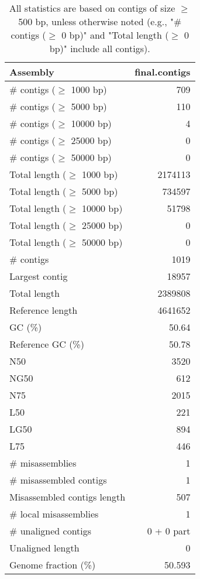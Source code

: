 \documentclass[12pt,a4paper]{article}
\begin{document}
\begin{table}[ht]
\begin{center}
\caption{All statistics are based on contigs of size $\geq$ 500 bp, unless otherwise noted (e.g., "\# contigs ($\geq$ 0 bp)" and "Total length ($\geq$ 0 bp)" include all contigs).}
\begin{tabular}{|l*{1}{|r}|}
\hline
Assembly & final.contigs \\ \hline
\# contigs ($\geq$ 1000 bp) & 709 \\ \hline
\# contigs ($\geq$ 5000 bp) & 110 \\ \hline
\# contigs ($\geq$ 10000 bp) & 4 \\ \hline
\# contigs ($\geq$ 25000 bp) & 0 \\ \hline
\# contigs ($\geq$ 50000 bp) & 0 \\ \hline
Total length ($\geq$ 1000 bp) & 2174113 \\ \hline
Total length ($\geq$ 5000 bp) & 734597 \\ \hline
Total length ($\geq$ 10000 bp) & 51798 \\ \hline
Total length ($\geq$ 25000 bp) & 0 \\ \hline
Total length ($\geq$ 50000 bp) & 0 \\ \hline
\# contigs & 1019 \\ \hline
Largest contig & 18957 \\ \hline
Total length & 2389808 \\ \hline
Reference length & 4641652 \\ \hline
GC (\%) & 50.64 \\ \hline
Reference GC (\%) & 50.78 \\ \hline
N50 & 3520 \\ \hline
NG50 & 612 \\ \hline
N75 & 2015 \\ \hline
L50 & 221 \\ \hline
LG50 & 894 \\ \hline
L75 & 446 \\ \hline
\# misassemblies & 1 \\ \hline
\# misassembled contigs & 1 \\ \hline
Misassembled contigs length & 507 \\ \hline
\# local misassemblies & 1 \\ \hline
\# unaligned contigs & 0 + 0 part \\ \hline
Unaligned length & 0 \\ \hline
Genome fraction (\%) & 50.593 \\ \hline

\end{tabular}
\end{center}
\end{table}
\end{document}
